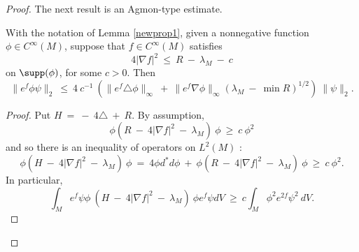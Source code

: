 \begin{proof}
The next result is an Agmon-type estimate.

\begin{lemma}
  \label{lem:kl-alternative-proof-cusp-incompressibility-positivity-entropy}
 \label{newprop2}
With the notation of Lemma \ref{newprop1},
given a nonnegative function $\phi \in C^\infty(M)$,
suppose that $f \in C^\infty(M)$ satisfies
\begin{equation}
4 |\nabla f|^2 \: \le \: R \: - \: \lambda_M \: - \: c
\end{equation}
on $\supp(\phi)$, for some $c > 0$. Then
\begin{equation} \label{eig3}
\|e^f \phi \psi\|_2 \: \le \: 4 \: c^{-1} \: \left( \|e^f \triangle \phi\|_\infty
\: + \: \|e^f \nabla \phi\|_\infty (\lambda_M \: - \: \min R)^{1/2} \right)
\: \|\psi\|_2.
\end{equation}
\end{lemma}
\begin{proof}
Put $H \: = \: - \: 4 \triangle \: + \: R$.
By assumption,
\begin{equation}
\phi (R \: - \: 4 |\nabla f|^2 \: - \: \lambda_M) \: \phi \: \ge \: c \: \phi^2
\end{equation}
and so there is an
 inequality of operators on $L^2(M)$ :
\begin{equation}
\phi (H \: - \: 4 |\nabla f|^2 \: - \: \lambda_M) \: \phi \: = \:
4 \phi d^* d \phi \: + \:
\phi (R \: - \: 4 |\nabla f|^2 \: - \: \lambda_M) \: \phi \:
\ge \: c \: \phi^2.
\end{equation}
In particular,
\begin{equation} \label{part1}
\int_M e^f \psi\phi \: (H \: - \: 4 |\nabla f|^2 \: - \: \lambda_M) \: \phi
e^f \psi dV \: \ge \: c \int_M \phi^2 e^{2f} \psi^2 \: dV.
\end{equation}


\end{proof}
\end{proof}

